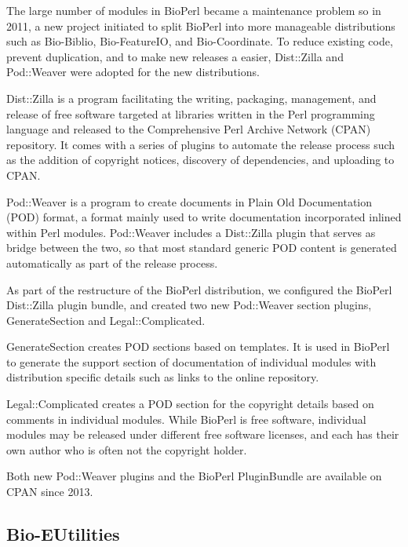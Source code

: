 The large number of modules in BioPerl became a maintenance problem
so in 2011, a new project initiated to split BioPerl into
more manageable distributions such as Bio-Biblio, Bio-FeatureIO, and
Bio-Coordinate.  To reduce existing code, prevent duplication,
and to make new releases
a easier, Dist::Zilla and Pod::Weaver were adopted for
the new distributions.

Dist::Zilla is a program facilitating the writing, packaging, management,
and release of free software targeted at libraries written in the Perl
programming language and released to the Comprehensive Perl Archive
Network (CPAN) repository.  It comes with a series of plugins to automate the
release process such as the addition of copyright notices, discovery
of dependencies, and uploading to CPAN.

Pod::Weaver is a program to create documents in Plain Old
Documentation (POD) format, a format mainly used to write
documentation incorporated inlined within Perl modules.
Pod::Weaver includes a Dist::Zilla plugin
that serves as bridge between the two, so that most
standard generic POD content is
generated automatically as part of the release process.

As part of the restructure of the BioPerl distribution, we configured
the BioPerl Dist::Zilla plugin bundle, and created two new Pod::Weaver
section plugins, GenerateSection and Legal::Complicated.

GenerateSection creates POD sections based on templates.  It is
used in BioPerl to generate the support section of documentation
of individual modules
with distribution specific details such as links to the online
repository.

Legal::Complicated creates a POD section for the copyright details
based on comments in individual modules.  While BioPerl is free
software, individual modules may be released under different free
software licenses, and each has their own author who is often not
the copyright holder.

Both new Pod::Weaver plugins and the BioPerl PluginBundle are available
on CPAN since 2013.

\subsection{Bio-EUtilities}

